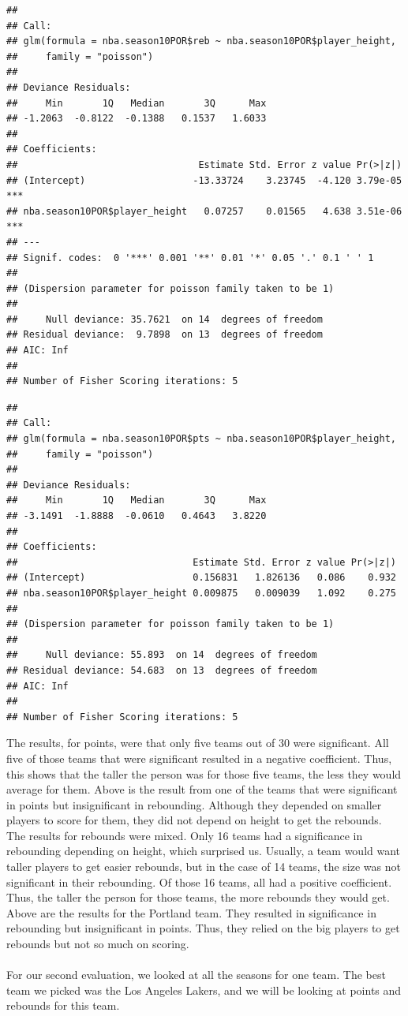 \documentclass[11pt,letterpaper]{amsart}
\begin{document}
\begin{verbatim}
## 
## Call:
## glm(formula = nba.season10POR$reb ~ nba.season10POR$player_height, 
##     family = "poisson")
## 
## Deviance Residuals: 
##     Min       1Q   Median       3Q      Max  
## -1.2063  -0.8122  -0.1388   0.1537   1.6033  
## 
## Coefficients:
##                                Estimate Std. Error z value Pr(>|z|)    
## (Intercept)                   -13.33724    3.23745  -4.120 3.79e-05 ***
## nba.season10POR$player_height   0.07257    0.01565   4.638 3.51e-06 ***
## ---
## Signif. codes:  0 '***' 0.001 '**' 0.01 '*' 0.05 '.' 0.1 ' ' 1
## 
## (Dispersion parameter for poisson family taken to be 1)
## 
##     Null deviance: 35.7621  on 14  degrees of freedom
## Residual deviance:  9.7898  on 13  degrees of freedom
## AIC: Inf
## 
## Number of Fisher Scoring iterations: 5
\end{verbatim}

\begin{verbatim}
## 
## Call:
## glm(formula = nba.season10POR$pts ~ nba.season10POR$player_height, 
##     family = "poisson")
## 
## Deviance Residuals: 
##     Min       1Q   Median       3Q      Max  
## -3.1491  -1.8888  -0.0610   0.4643   3.8220  
## 
## Coefficients:
##                               Estimate Std. Error z value Pr(>|z|)
## (Intercept)                   0.156831   1.826136   0.086    0.932
## nba.season10POR$player_height 0.009875   0.009039   1.092    0.275
## 
## (Dispersion parameter for poisson family taken to be 1)
## 
##     Null deviance: 55.893  on 14  degrees of freedom
## Residual deviance: 54.683  on 13  degrees of freedom
## AIC: Inf
## 
## Number of Fisher Scoring iterations: 5
\end{verbatim}\leavevmode \newline
\indent The results, for points, were that only five teams out of 30 were significant. All five of those teams that were significant resulted in a negative coefficient. Thus, this shows that the taller the person was for those five teams, the less they would average for them. Above is the result from one of the teams that were significant in points but insignificant in rebounding. Although they depended on smaller players to score for them, they did not depend on height to get the rebounds.\\
\indent The results for rebounds were mixed. Only 16 teams had a significance in rebounding depending on height, which surprised us. Usually, a team would want taller players to get easier rebounds, but in the case of 14 teams, the size was not significant in their rebounding. Of those 16 teams, all had a positive coefficient. Thus, the taller the person for those teams, the more rebounds they would get. Above are the results for the Portland team. They resulted in significance in rebounding but insignificant in points. Thus, they relied on the big players to get rebounds but not so much on scoring.\\\\
\indent For our second evaluation, we looked at all the seasons for one team. The best team we picked was the Los Angeles Lakers, and we will be looking at points and rebounds for this team.\\
\end{document}
